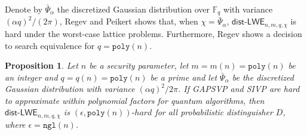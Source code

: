 \documentclass[11pt]{article}
\newcommand{\secref}[1]{\mbox{Section~\ref{#1}}}
\newcommand{\defref}[1]{\mbox{Definition~\ref{#1}}}
\newcommand{\class}[1]{{\ensuremath{\mathsf{#1}}}}
\newcommand{\vect}[1]{\ensuremath{\textbf{#1}}}
\newcommand{\Fq}{\ensuremath{\mathbb{F}_q}}
\newcommand{\unp}{\ensuremath{\mathtt{unp}}\xspace}
\newcommand{\poly}{\ensuremath{\mathtt{poly}}\xspace}
\newcommand{\ngl}{\ensuremath{\mathtt{ngl}}\xspace}
\newcommand{\lwe}{\class{LWE}}
\newcommand{\distLWE}{\ensuremath{\class{dist\mbox{-}LWE}}}
\newtheorem{proposition}[theorem]{Proposition}
\newcommand{\vA}{\vect{A}}
\newcommand{\vx}{\vect{x}}
\begin{document}
Denote by $\bar{\Psi}_\alpha$ the discretized Gaussian distribution over $\Fq$ with variance $(\alpha q)^2/(2\pi)$, Regev\cite{regev2005LWE} and Peikert \cite{peikert2009latticereduction} shows that, when $\chi = \bar{\Psi}_{\alpha}$, $\class{dist}$-$\lwe_{n, m, q, \chi}$ is hard under the worst-case lattice problems.
Furthermore, Regev \cite{regev2005LWE} shows a decision to search equivalence for $q=\poly(n)$.


\begin{proposition} 
\label{assume:entropy LWE}
Let $n$ be a security parameter, let $m = m(n) = \poly(n)$ be an integer and $q = q(n) = \poly(n)$ be a prime and let $\bar{\Psi}_\alpha$ be the discretized Gaussian distribution with variance $(\alpha q)^2/2\pi$.  If GAPSVP and SIVP are hard to approximate within polynomial factors for quantum algorithms, then $\distLWE_{n, m, q, \chi}$ is $(\epsilon, \poly(n))\mbox{-}hard$ for all probabilistic distinguisher $D$, where $\epsilon = \ngl(n)$.

\end{proposition}
\end{document}
